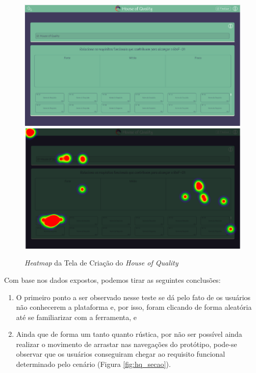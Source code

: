 \begin{figure}[]
  \begin{center}
      \caption{{\textit{Heatmap} da Tela de Criação do \textit{House of Quality}}}
      \label{fig:hoq_hm_2}
      \includegraphics[scale=0.45]{figuras/UsabilityHub/hoq/3.png}
      \includegraphics[scale=0.45]{figuras/UsabilityHub/hoq/4.png}
  \end{center}
\end{figure}

Com base nos dados expostos, podemos tirar as seguintes conclusões:
\begin{enumerate}
    \item O primeiro ponto a ser observado nesse teste se dá pelo fato de os usuários não conhecerem a plataforma e, por isso, foram clicando de forma aleatória até se familiarizar com a ferramenta, e
    \item Ainda que de forma um tanto quanto rústica, por não ser possível ainda realizar o movimento de arrastar nas navegações do protótipo, pode-se observar que os usuários conseguiram chegar ao requisito funcional determinado pelo cenário (Figura \ref{fig:hq_secao}).
\end{enumerate}

